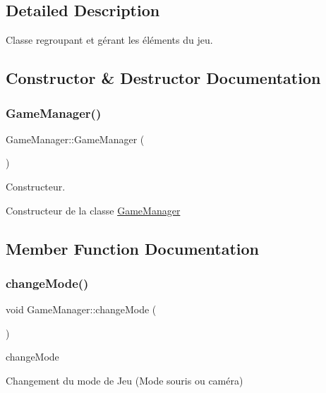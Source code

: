 \subsection{Detailed Description}
Classe regroupant et gérant les éléments du jeu. 

\subsection{Constructor \& Destructor Documentation}
\mbox{\label{class_game_manager_aa0e2424dc1a39d380e5b6605b179bf05}} 
\subsubsection{\texorpdfstring{Game\+Manager()}{GameManager()}}
{\footnotesize\ttfamily Game\+Manager\+::\+Game\+Manager (\begin{DoxyParamCaption}{ }\end{DoxyParamCaption})}



Constructeur. 

Constructeur de la classe \mbox{\hyperlink{class_game_manager}{Game\+Manager}} 

\subsection{Member Function Documentation}
\mbox{\label{class_game_manager_a707019231d8892afbe87da17dc31ae9e}} 
\subsubsection{\texorpdfstring{change\+Mode()}{changeMode()}}
{\footnotesize\ttfamily void Game\+Manager\+::change\+Mode (\begin{DoxyParamCaption}{ }\end{DoxyParamCaption})\hspace{0.3cm}{\ttfamily [inline]}}



change\+Mode 

Changement du mode de Jeu (Mode souris ou caméra) \mbox{\label{class_game_manager_a2bd2b0363ac1c5c6026029fba4d41e38}} 
